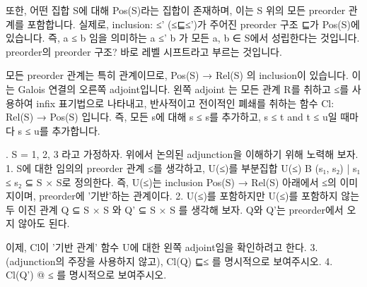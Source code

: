\documentclass[11pt, a4paper, twoside, openany]{book}
\begin{document}
\par\medskip
또한, 어떤 집합 S\hspace{0pt}에 대해 Pos(S)라는 집합이 존재하며, 이는 S 위의 모든 preorder 관계를 포함합니다. 실제로, inclusion: ≤' (≤⊑≤')가 주어진 preorder 구조 ⊑가 Pos(S)에 있습니다. 즉, a ≤ b 임을 의미하는 a ≤' b 가 모든 a, b ∈ S\hspace{0pt}에서 성립한다는 것입니다. preorder\hspace{0pt}의 preorder 구조? 바로 레벨 시프트라고 부르는 것입니다.

\par\medskip
모든 preorder 관계는 특히 관계이므로, Pos(S) → Rel(S) 의 inclusion\hspace{0pt}이 있습니다.
이는 Galois 연결의 오른쪽 adjoint\hspace{0pt}입니다.
왼쪽 adjoint 는 모든 관계 R\hspace{0pt}를 취하고 ≤를 사용하여 infix 표기법으로 나타내고, 반사적이고 전이적인 폐쇄를 취하는 함수 Cl: Rel(S) → Pos(S) 입니다. 즉, 모든 s\hspace{0pt}에 대해 s ≤ s\hspace{0pt}를 추가하고, s ≤ t and t ≤ u\hspace{0pt}일 때마다 s ≤ u\hspace{0pt}를 추가합니다.

\par\medskip
\begin{exercisebox}[Exercise 1.125]
.
S = {1, 2, 3} 라고 가정하자. 위에서 논의된 adjunction\hspace{0pt}을 이해하기 위해 노력해 보자.
1. S\hspace{0pt}에 대한 임의의 preorder 관계 ≤를 생각하고, U(≤)를 부분집합 U(≤) B {(s₁, s₂) | s₁ ≤ s₂} ⊆ S × S\hspace{0pt}로 정의한다. 즉, U(≤)는 inclusion Pos(S) → Rel(S) 아래에서 ≤의 이미지이며, preorder\hspace{0pt}에 '기반'하는 관계이다.
2. U(≤)를 포함하지만 U(≤)를 포함하지 않는 두 이진 관계 Q ⊆ S × S 와 Q' ⊆ S × S 를 생각해 보자. Q\hspace{0pt}와 Q'는 preorder\hspace{0pt}에서 오지 않아도 된다.
\end{exercisebox}

\par\medskip
이제, Cl\hspace{0pt}이 '기반 관계' 함수 U\hspace{0pt}에 대한 왼쪽 adjoint\hspace{0pt}임을 확인하려고 한다.
3. (adjunction\hspace{0pt}의 주장을 사용하지 않고), Cl(Q) ⊑≤  를 명시적으로 보여주시오. 
4. Cl(Q') @ ≤ 를 명시적으로 보여주시오.
\end{document}
